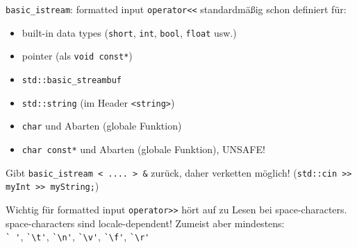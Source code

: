 \begin{frame}[fragile]{\texttt{basic\_istream}: formatted input}
	\texttt{operator<<} standardmäßig schon definiert für:
	\begin{itemize}
		\item built-in data types (\texttt{short}, \texttt{int}, \texttt{bool}, \texttt{float} usw.)
		\item pointer (als \texttt{void const*})
		\item \texttt{std::basic\_streambuf}
		\item \texttt{std::string} (im Header \texttt{<string>})
		\item \texttt{char} und Abarten {\tiny (globale Funktion)}
		\item \texttt{char const*} und Abarten {\tiny (globale Funktion)}, \alert{UNSAFE!}
	\end{itemize}
	Gibt \texttt{basic\_istream < .... > \&} zurück, daher verketten möglich! (\texttt{std::cin >> myInt >> myString;})
	
	\pause
	\vspace{1em}
	
	\begin{block}{Wichtig für formatted input}
		\texttt{operator>>} hört auf zu Lesen bei space-characters.
		space-characters sind locale-dependent! Zumeist aber mindestens:\\
		\verb|` '|, \verb|`\t'|, \verb|`\n'|, \verb|`\v'|, \verb|`\f'|, \verb|`\r'|
	\end{block}
\end{frame}


